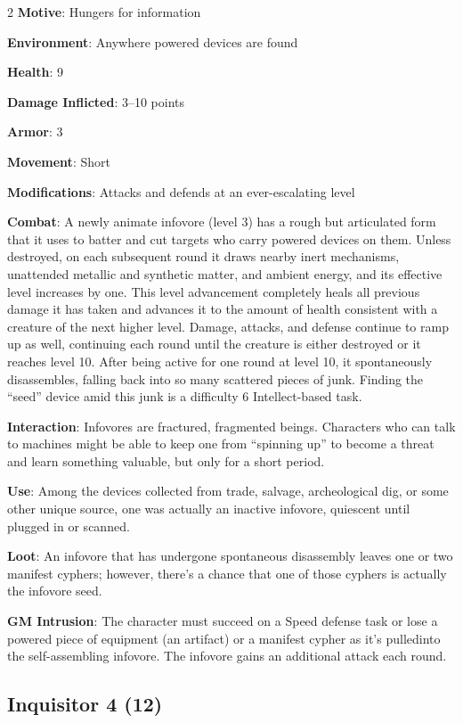 \begin{multicols}{2}
\textbf{Motive}: Hungers for information 

\textbf{Environment}: Anywhere powered devices are found 

\textbf{Health}: 9 

\textbf{Damage Inflicted}:  3–10 points 

\textbf{Armor}: 3 

\textbf{Movement}: Short 

\textbf{Modifications}: Attacks and defends at an ever-escalating level 

\textbf{Combat}: A newly animate infovore (level 3) has a rough but articulated form that it uses to batter and cut targets who carry powered devices on them. Unless destroyed, on each subsequent round it draws nearby inert mechanisms, unattended metallic and synthetic matter, and ambient energy, and its effective level increases by one. This level advancement completely heals all previous damage it has taken and advances it to the amount of health consistent with a creature of the next higher level. Damage, attacks, and defense continue to ramp up as well, continuing each round until the creature is either destroyed or it reaches level 10. After being active for one round at level 10, it spontaneously disassembles, falling back into so many scattered pieces of junk. Finding the “seed” device amid this junk is a difficulty 6 Intellect-based task. 

\textbf{Interaction}: Infovores are fractured, fragmented beings. Characters who can talk to machines might be able to keep one from “spinning up” to become a threat and learn something valuable, but only for a short period. 

\textbf{Use}: Among the devices collected from trade, salvage, archeological dig, or some other unique source, one was actually an inactive infovore, quiescent until plugged in or scanned. 

\textbf{Loot}: An infovore that has undergone spontaneous disassembly leaves one or two manifest cyphers; however, there’s a chance that one of those cyphers is actually the infovore seed.

\textbf{GM Intrusion}: The character must succeed on a Speed defense task or lose a powered piece of equipment (an artifact) or a manifest cypher as it’s pulledinto the self-assembling infovore. The infovore gains an additional attack each round.

\subsection{Inquisitor 4 (12)}


\end{multicols}
